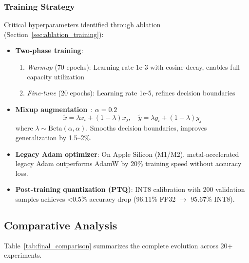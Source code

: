 \documentclass[10pt,a4paper,twoside]{article}
\begin{document}
\subsubsection{Training Strategy}

Critical hyperparameters identified through ablation (Section~\ref{sec:ablation_training}):

\begin{itemize}
	\item \textbf{Two-phase training}:
	\begin{enumerate}
		\item \textit{Warmup} (70 epochs): Learning rate 1e-3 with cosine decay, enables full capacity utilization
		\item \textit{Fine-tune} (20 epochs): Learning rate 1e-5, refines decision boundaries
	\end{enumerate}

	\item \textbf{Mixup augmentation}~\cite{zhang2017mixup}: $\alpha=0.2$
	\begin{equation}
		\tilde{x} = \lambda x_i + (1-\lambda) x_j, \quad \tilde{y} = \lambda y_i + (1-\lambda) y_j
	\end{equation}
	where $\lambda \sim \text{Beta}(\alpha, \alpha)$. Smooths decision boundaries, improves generalization by 1.5--2\%.

	\item \textbf{Legacy Adam optimizer}: On Apple Silicon (M1/M2), metal-accelerated legacy Adam outperforms AdamW by 20\% training speed without accuracy loss.

	\item \textbf{Post-training quantization (PTQ)}: INT8 calibration with 200 validation samples achieves <0.5\% accuracy drop (96.11\% FP32 $\to$ 95.67\% INT8).
\end{itemize}

\subsection{Comparative Analysis}
\label{sec:comparison}

Table~\ref{tab:final_comparison} summarizes the complete evolution across 20+ experiments.
\end{document}
